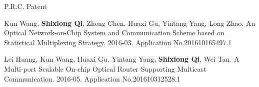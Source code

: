 \documentclass{resume} %
\begin{document}
\begin{rSection}{P.R.C. Patent}
\begin{rSubsection}{}{}{}{}

\item Kun Wang, {\bf Shixiong Qi}, Zheng Chen, Huaxi Gu, Yintang Yang, Long Zhao. An Optical Network-on-Chip System and Communication Scheme based on Statistical Multiplexing Strategy. 2016-03. Application No.201610165497.1
\item Lei Huang, Kun Wang, Huaxi Gu, Yintang Yang, {\bf Shixiong Qi}, Wei Tan. A Multi-port Scalable On-chip Optical Router Supporting Multicast Communication. 2016-05. Application No.201610312528.1

\end{rSubsection}
\end{rSection}



\end{document}

